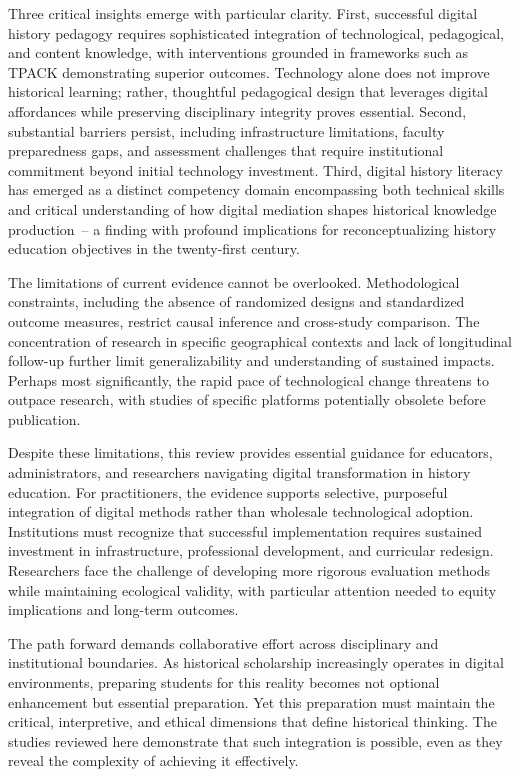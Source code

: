 \documentclass[
hf,
]{ceurart}
\begin{document}
Three critical insights emerge with particular clarity. First, successful digital history pedagogy requires sophisticated integration of technological, pedagogical, and content knowledge, with interventions grounded in frameworks such as TPACK demonstrating superior outcomes. Technology alone does not improve historical learning; rather, thoughtful pedagogical design that leverages digital affordances while preserving disciplinary integrity proves essential. Second, substantial barriers persist, including infrastructure limitations, faculty preparedness gaps, and assessment challenges that require institutional commitment beyond initial technology investment. Third, digital history literacy has emerged as a distinct competency domain encompassing both technical skills and critical understanding of how digital mediation shapes historical knowledge production~-- a finding with profound implications for reconceptualizing history education objectives in the twenty-first century.

The limitations of current evidence cannot be overlooked. Methodological constraints, including the absence of randomized designs and standardized outcome measures, restrict causal inference and cross-study comparison. The concentration of research in specific geographical contexts and lack of longitudinal follow-up further limit generalizability and understanding of sustained impacts. Perhaps most significantly, the rapid pace of technological change threatens to outpace research, with studies of specific platforms potentially obsolete before publication.

Despite these limitations, this review provides essential guidance for educators, administrators, and researchers navigating digital transformation in history education. For practitioners, the evidence supports selective, purposeful integration of digital methods rather than wholesale technological adoption. Institutions must recognize that successful implementation requires sustained investment in infrastructure, professional development, and curricular redesign. Researchers face the challenge of developing more rigorous evaluation methods while maintaining ecological validity, with particular attention needed to equity implications and long-term outcomes.

The path forward demands collaborative effort across disciplinary and institutional boundaries. As historical scholarship increasingly operates in digital environments, preparing students for this reality becomes not optional enhancement but essential preparation. Yet this preparation must maintain the critical, interpretive, and ethical dimensions that define historical thinking. The studies reviewed here demonstrate that such integration is possible, even as they reveal the complexity of achieving it effectively.
\end{document}

